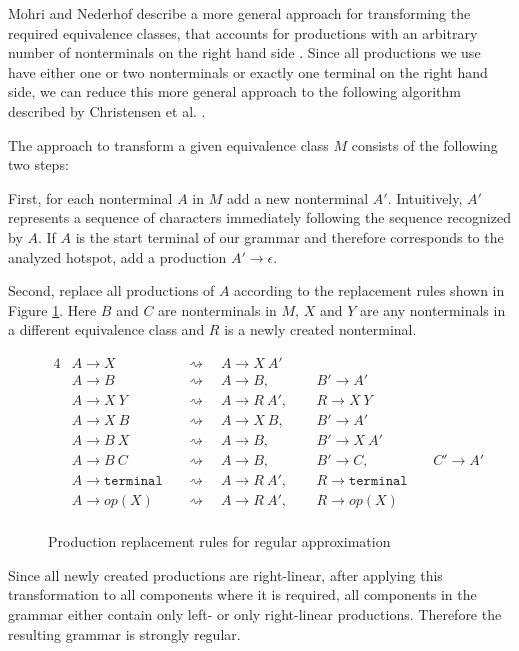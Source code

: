 Mohri and Nederhof describe a more general approach for transforming the required equivalence classes, that accounts for productions with an arbitrary number of nonterminals on the right hand side \cite{mohri_nederhof}. Since all productions we use have either one or two nonterminals or exactly one terminal on the right hand side, we can reduce this more general approach to the following algorithm described by Christensen et al. \cite{brics}.

The approach to transform a given equivalence class $M$ consists of the following two steps:

First, for each nonterminal $A$ in $M$ add a new nonterminal $A'$. Intuitively, $A'$ represents a sequence of characters immediately following the sequence recognized by $A$. If $A$ is the start terminal of our grammar and therefore corresponds to the analyzed hotspot, add a production $A' \rightarrow \epsilon$.

Second, replace all productions of $A$ according to the replacement rules shown in Figure \ref{fig:approx:prodreplacement}. Here $B$ and $C$ are nonterminals in $M$, $X$ and $Y$ are any nonterminals in a different equivalence class and $R$ is a newly created nonterminal.

\begin{figure}[!h]
	\begin{alignat*}{4}
		& A \rightarrow X 	 && \rightsquigarrow \quad A \rightarrow X\ A'\ \  & &\\
		& A \rightarrow B 	 && \rightsquigarrow \quad A \rightarrow B,\ \ 	   & &B' \rightarrow A'\ &&\\
		& A \rightarrow X\ Y && \rightsquigarrow \quad A \rightarrow R\ A',\ \ & &R  \rightarrow X\ Y\ &&\\
		& A \rightarrow X\ B && \rightsquigarrow \quad A \rightarrow X\ B,\ \  & &B' \rightarrow A'\ &&\\
		& A \rightarrow B\ X && \rightsquigarrow \quad A \rightarrow B,\ \ 	   & &B' \rightarrow X\ A'\ &&\\
		& A \rightarrow B\ C && \rightsquigarrow \quad A \rightarrow B,\ \     & &B' \rightarrow C,\ &&C' \rightarrow A'\\
		& A \rightarrow \texttt{terminal} && \rightsquigarrow \quad A \rightarrow R\ A',\ \ & &R \rightarrow \texttt{terminal}\ &&\\
		& A \rightarrow op(X) && \rightsquigarrow  \quad A \rightarrow R\ A',\ \ & &R \rightarrow op(X)\ &&\\
	\end{alignat*}
\caption{Production replacement rules for regular approximation}
\label{fig:approx:prodreplacement}
\end{figure}
Since all newly created productions are right-linear, after applying this transformation to all components where it is required, all components in the grammar either contain only left- or only right-linear productions. Therefore the resulting grammar is strongly regular.

